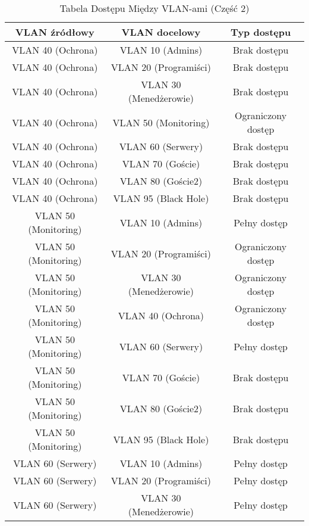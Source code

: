 \begin{table}[htbp]
\centering
\caption{Tabela Dostępu Między VLAN-ami (Część 2)}
\begin{tabular}{|c|c|c|}
\hline
\textbf{VLAN źródłowy} & \textbf{VLAN docelowy} & \textbf{Typ dostępu} \\ \hline
VLAN 40 (Ochrona)      & VLAN 10 (Admins)       & Brak dostępu         \\ \hline
VLAN 40 (Ochrona)      & VLAN 20 (Programiści)  & Brak dostępu         \\ \hline
VLAN 40 (Ochrona)      & VLAN 30 (Menedżerowie) & Brak dostępu         \\ \hline
VLAN 40 (Ochrona)      & VLAN 50 (Monitoring)   & Ograniczony dostęp   \\ \hline
VLAN 40 (Ochrona)      & VLAN 60 (Serwery)      & Brak dostępu         \\ \hline
VLAN 40 (Ochrona)      & VLAN 70 (Goście)       & Brak dostępu         \\ \hline
VLAN 40 (Ochrona)      & VLAN 80 (Goście2)      & Brak dostępu         \\ \hline
VLAN 40 (Ochrona)      & VLAN 95 (Black Hole)   & Brak dostępu         \\ \hline
VLAN 50 (Monitoring)   & VLAN 10 (Admins)       & Pełny dostęp         \\ \hline
VLAN 50 (Monitoring)   & VLAN 20 (Programiści)  & Ograniczony dostęp   \\ \hline
VLAN 50 (Monitoring)   & VLAN 30 (Menedżerowie) & Ograniczony dostęp   \\ \hline
VLAN 50 (Monitoring)   & VLAN 40 (Ochrona)      & Ograniczony dostęp   \\ \hline
VLAN 50 (Monitoring)   & VLAN 60 (Serwery)      & Pełny dostęp         \\ \hline
VLAN 50 (Monitoring)   & VLAN 70 (Goście)       & Brak dostępu         \\ \hline
VLAN 50 (Monitoring)   & VLAN 80 (Goście2)      & Brak dostępu         \\ \hline
VLAN 50 (Monitoring)   & VLAN 95 (Black Hole)   & Brak dostępu         \\ \hline
VLAN 60 (Serwery)      & VLAN 10 (Admins)       & Pełny dostęp         \\ \hline
VLAN 60 (Serwery)      & VLAN 20 (Programiści)  & Pełny dostęp         \\ \hline
VLAN 60 (Serwery)      & VLAN 30 (Menedżerowie) & Pełny dostęp         \\ \hline

\end{tabular}
\end{table}
